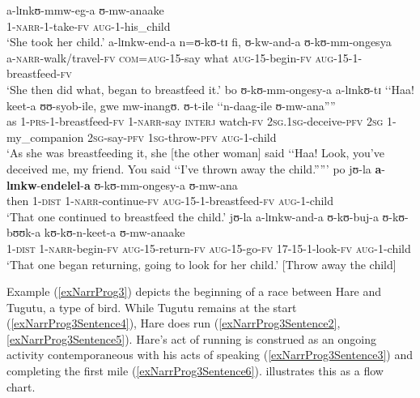 \begin{exe}
\ex\label{exNarrProg2}
\begin{xlist}
\ex\label{exNarrProg2Sentence1}\gll a-lɪnkʊ-mmw-eg-a ʊ-mw-anaake\\
1-\textsc{narr}-1-take-\textsc{fv} \textsc{aug}-1-his\_child\\
\glt \lq She took her child.'
\ex\label{exNarrProg2Sentence2}\gll a-lɪnkw-end-a n=ʊ-kʊ-tɪ fi, ʊ-kw-and-a ʊ-kʊ-mm-ongesya\\
a-\textsc{narr}-walk/travel-\textsc{fv} \textsc{com}=\textsc{aug}-15-say what \textsc{aug}-15-begin-\textsc{fv} \textsc{aug}-15-1-breastfeed-\textsc{fv}\\
\glt \lq She then did what, began to breastfeed it.'
\ex\label{exNarrProg2Sentence3}\gll bo ʊ-kʊ-mm-ongesy-a a-lɪnkʊ-tɪ \lq\lq Haa! keet-a ʊʊ-syob-ile, gwe mw-inangʊ. ʊ-t-ile \lq\lq n-daag-ile ʊ-mw-ana''{}''\\
as 1-\textsc{prs}-1-breastfeed-\textsc{fv} 1-\textsc{narr}-say \textsc{interj} \phantom{\lq\lq}watch-\textsc{fv} \textsc{2sg.1sg}-deceive-\textsc{pfv} \textsc{2sg} 1-my\_companion \textsc{2sg}-say-\textsc{pfv} \textsc{1sg}-throw-\textsc{pfv} \textsc{aug}-1-child\\
\glt \lq As she was breastfeeding it, she [the other woman] said \lq\lq Haa! Look, you've deceived me, my friend. You said \lq\lq I've thrown away the child.''{}''{}'
\ex \label{exNarrProg2Sentence4}\gll po jʊ-la \textbf{a}-\textbf{lɪnkw}-\textbf{endelel}-\textbf{a} ʊ-kʊ-mm-ongesy-a ʊ-mw-ana\\
then 1-\textsc{dist} 1-\textsc{narr}-continue-\textsc{fv} \textsc{aug}-15-1-breastfeed-\textsc{fv} \textsc{aug}-1-child\\
\lq That one continued to breastfeed the child.'
\ex \label{exNarrProg2Sentence5}
\gll jʊ-la a-lɪnkw-and-a ʊ-kʊ-buj-a ʊ-kʊ-bʊʊk-a kʊ-kʊ-n-keet-a ʊ-mw-anaake\\
1-\textsc{dist} 1-\textsc{narr}-begin-\textsc{fv} \textsc{aug}-15-return-\textsc{fv} \textsc{aug}-15-go-\textsc{fv} 17-15-1-look-\textsc{fv} \textsc{aug}-1-child\\
\glt \lq That one began returning, going to look for her child.' [Throw away the child]
\end{xlist}
\end{exe}

\largerpage
Example (\ref{exNarrProg3}) depicts the beginning of a race between Hare and Tugutu, a type of bird. While Tugutu remains at the start (\ref{exNarrProg3Sentence4}), Hare does run (\ref{exNarrProg3Sentence2}, \ref{exNarrProg3Sentence5}). Hare's act of running is construed as an ongoing activity contemporaneous with his acts of speaking (\ref{exNarrProg3Sentence3}) and completing the first mile (\ref{exNarrProg3Sentence6}).  illustrates this as a flow chart.

